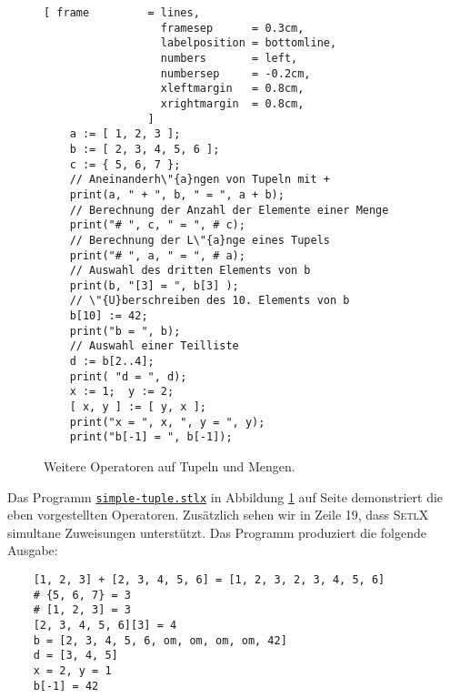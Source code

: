 \begin{figure}[!ht]
  \centering
\begin{Verbatim}[ frame         = lines, 
                  framesep      = 0.3cm, 
                  labelposition = bottomline,
                  numbers       = left,
                  numbersep     = -0.2cm,
                  xleftmargin   = 0.8cm,
                  xrightmargin  = 0.8cm,
                ]
    a := [ 1, 2, 3 ];
    b := [ 2, 3, 4, 5, 6 ];
    c := { 5, 6, 7 };
    // Aneinanderh\"{a}ngen von Tupeln mit +
    print(a, " + ", b, " = ", a + b);
    // Berechnung der Anzahl der Elemente einer Menge
    print("# ", c, " = ", # c);
    // Berechnung der L\"{a}nge eines Tupels
    print("# ", a, " = ", # a);
    // Auswahl des dritten Elements von b
    print(b, "[3] = ", b[3] );
    // \"{U}berschreiben des 10. Elements von b
    b[10] := 42;
    print("b = ", b);
    // Auswahl einer Teilliste
    d := b[2..4];
    print( "d = ", d);
    x := 1;  y := 2;
    [ x, y ] := [ y, x ];
    print("x = ", x, ", y = ", y);
    print("b[-1] = ", b[-1]);
\end{Verbatim} 
\vspace*{-0.3cm}
\caption{Weitere Operatoren auf Tupeln und Mengen.}  \label{fig:simple-tuple.stlx}
\end{figure} %

Das Programm 
\href{https://github.com/karlstroetmann/Logik/blob/master/SetlX/simple-tuple.stlx}{\texttt{simple-tuple.stlx}}
in Abbildung \ref{fig:simple-tuple.stlx} auf Seite
\pageref{fig:simple-tuple.stlx} demonstriert die eben vorgestellten Operatoren.  
Zus\"{a}tzlich sehen wir in Zeile 19, dass \textsc{SetlX} simultane Zuweisungen unterst\"{u}tzt.
Das Programm produziert die folgende Ausgabe:
\begin{verbatim}
    [1, 2, 3] + [2, 3, 4, 5, 6] = [1, 2, 3, 2, 3, 4, 5, 6]
    # {5, 6, 7} = 3
    # [1, 2, 3] = 3
    [2, 3, 4, 5, 6][3] = 4
    b = [2, 3, 4, 5, 6, om, om, om, om, 42]
    d = [3, 4, 5]
    x = 2, y = 1
    b[-1] = 42
\end{verbatim}


